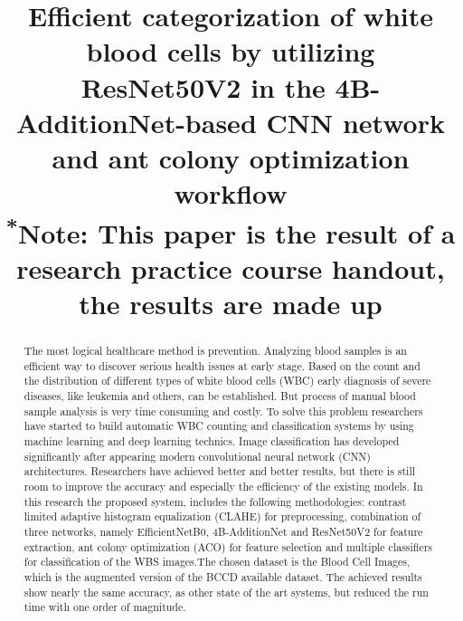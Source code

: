 \documentclass[conference]{IEEEtran}
\begin{document}
\title{Efficient categorization of white blood cells by utilizing ResNet50V2 in the
4B-AdditionNet-based CNN network and ant colony optimization workflow\\
{\footnotesize \textsuperscript{*}Note: This paper is the result of a research practice course handout, the results are made up}
}

\author{
\and
{}
\and
{}
\and
{}
}

\maketitle

\begin{abstract}
The most logical healthcare method is prevention. Analyzing blood samples is an efficient way to discover serious health issues at early stage. 
Based on the count and the distribution of different types of white blood cells (WBC) early diagnosis of severe diseases, like leukemia and others, can be established. 
But process of manual blood sample analysis is very time consuming and costly. To solve this problem researchers have started to build automatic WBC counting and classification 
systems by using machine learning and deep learning technics. Image classification has developed significantly after appearing modern convolutional neural network (CNN) architectures. 
Researchers have achieved better and better results, but there is still room to improve the accuracy and especially the efficiency of the existing models. 
In this research the proposed system, includes the following methodologies: contrast limited adaptive histogram equalization (CLAHE) for preprocessing, 
combination of three networks, namely EfficientNetB0, 4B-AdditionNet and ResNet50V2 for feature extraction, ant colony optimization (ACO) for feature selection and multiple classifiers 
for classification of the WBS images.The chosen dataset is the Blood Cell Images, which is the augmented version of the BCCD  available dataset. The achieved results show nearly the same accuracy, as other state of the art systems, but reduced the run time with one order of magnitude.

\end{abstract}
\end{document}
